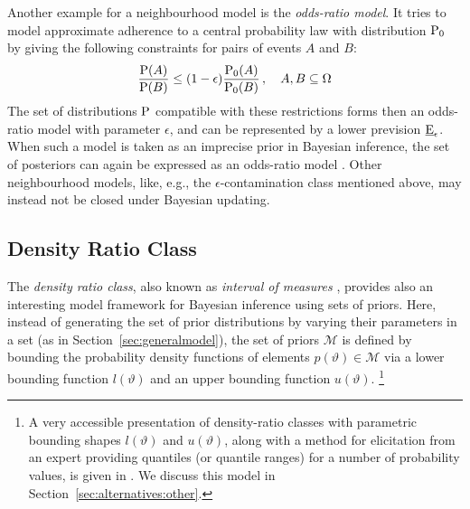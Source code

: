 Another example for a neighbourhood model is the \emph{odds-ratio model}.
It tries to model approximate adherence to a central probability law with distribution $\operatorname{P}_0$
by giving the following constraints for pairs of events $A$ and $B$:
\begin{align*}
\frac{\operatorname{P}(A)}{\operatorname{P}(B)} \le (1-\epsilon)\frac{\operatorname{P}_0(A)}{\operatorname{P}_0(B)}\,,\quad A, B \subseteq \Omega
\end{align*}
The set of distributions $\operatorname{P}$ compatible with these restrictions
forms then an odds-ratio model with parameter $\epsilon$,
and can be represented by a lower prevision $\underline{\operatorname{E}}_\epsilon$.
When such a model is taken as an imprecise prior in Bayesian inference,
the set of posteriors can again be expressed as an odds-ratio model
\parencite[\S 7.2]{itip-special}.
Other neighbourhood models, like, e.g., the $\epsilon$-contamination class
mentioned above,
may instead not be closed under Bayesian updating.


\subsection{Density Ratio Class}
\label{alternatives:drc}

The \emph{density ratio class}, also known as \emph{interval of measures}
\parencites{1981:derobertis}{1990:berger},
provides also an interesting model framework for Bayesian inference using sets of priors.
Here, instead of generating the set of prior distributions by varying their parameters in a set
(as in Section~\ref{sec:generalmodel}),
the set of priors $\mathcal{M}$ is defined by bounding the probability density functions
of elements $p(\vartheta) \in \mathcal{M}$
via a lower bounding function $l(\vartheta)$ and an upper bounding function $u(\vartheta)$.%
\footnote{\label{foot:rinderknecht}A very accessible presentation of density-ratio classes with
parametric bounding shapes $l(\vartheta)$ and $u(\vartheta)$,
along with a method for elicitation from an expert
providing quantiles (or quantile ranges) for a number of probability values,
is given in \textcite{2011:rinderknecht}.
We discuss this model in Section~\ref{sec:alternatives:other}.}


